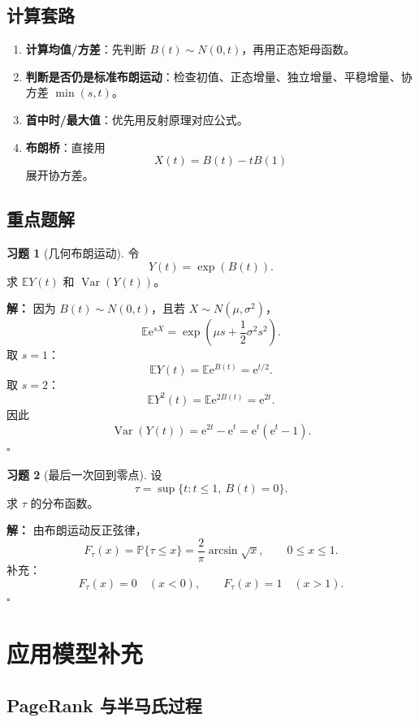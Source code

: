 \documentclass[12pt,a4paper,openany]{ctexrep}
\theoremstyle{definition}
\newtheorem{exercise}{习题}[section]
\newenvironment{solution}{\par\noindent\textbf{解：}}{\hfill$\square$\par}
\newcommand{\E}{\mathbb{E}}
\newcommand{\Var}{\operatorname{Var}}
\newcommand{\Pp}{\mathbb{P}}
\newcommand{\e}{\mathrm{e}}
\begin{document}
\section{计算套路}

\begin{enumerate}[label=\textbf{套路 \arabic*:}]
	\item \textbf{计算均值/方差}：先判断 $B(t)\sim N(0,t)$，再用正态矩母函数。
	\item \textbf{判断是否仍是标准布朗运动}：检查初值、正态增量、独立增量、平稳增量、协方差 $\min(s,t)$。
	\item \textbf{首中时/最大值}：优先用反射原理对应公式。
	\item \textbf{布朗桥}：直接用
	\[
	X(t)=B(t)-tB(1)
	\]
	展开协方差。
\end{enumerate}

\section{重点题解}

\begin{exercise}[几何布朗运动]
令
\[
Y(t)=\exp(B(t)).
\]
求 $\E Y(t)$ 和 $\Var(Y(t))$。
\end{exercise}

\begin{solution}
因为 $B(t)\sim N(0,t)$，且若 $X\sim N(\mu,\sigma^2)$，
\[
\E\e^{sX}=\exp\left(\mu s+\frac12\sigma^2s^2\right).
\]
取 $s=1$：
\[
\E Y(t)=\E\e^{B(t)}=\e^{t/2}.
\]
取 $s=2$：
\[
\E Y^2(t)=\E\e^{2B(t)}=\e^{2t}.
\]
因此
\[
\Var(Y(t))=\e^{2t}-\e^t=\e^t(\e^t-1).
\]
\end{solution}

\begin{exercise}[最后一次回到零点]
设
\[
\tau=\sup\{t:t\le1,\ B(t)=0\}.
\]
求 $\tau$ 的分布函数。
\end{exercise}

\begin{solution}
由布朗运动反正弦律，
\[
F_\tau(x)=\Pp\{\tau\le x\}
=
\frac2\pi\arcsin\sqrt{x},\qquad 0\le x\le1.
\]
补充：
\[
F_\tau(x)=0\quad(x<0),\qquad F_\tau(x)=1\quad(x>1).
\]
\end{solution}

\chapter{应用模型补充}

\section{PageRank 与半马氏过程}
\end{document}
